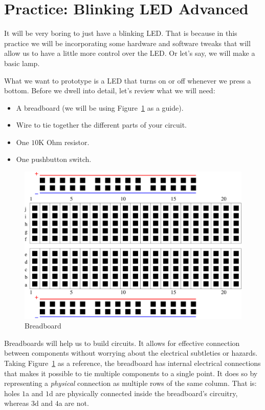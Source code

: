 \section{Practice: Blinking LED Advanced}\label{pract:blinkingLEDAdvanced}

It will be very boring to just have a blinking LED. That is because in this practice we will be incorporating some hardware and software tweaks that will allow us to have a little more control over the LED. Or let's say, we will make a basic lamp.

What we want to prototype is a LED that turns on or off whenever we press a bottom. Before we dwell into detail, let's review what we will need:

\begin{itemize}
	\item A breadboard (we will be using Figure~\ref{fig:breadboard} as a guide).
	\item Wire to tie together the different parts of your circuit.
	\item One $10$K Ohm resistor.
	\item One pushbutton switch.	
\end{itemize}

\begin{figure}[htbp]
  \centering
  \includegraphics[width=0.7\linewidth]{figures/breadboard.eps}
  \caption{Breadboard
  \label{fig:breadboard}}
\end{figure}

Breadboards will help us to build circuits. It allows for effective connection between components without worrying about the electrical subtleties or hazards. Taking Figure~\ref{fig:breadboard} as a reference, the breadboard has internal electrical connections that makes it possible to tie multiple components to a single point. It does so by representing a \emph{physical} connection as multiple rows of the same column. That is: holes $1$a and $1$d are physically connected inside the breadboard's circuitry, whereas $3$d and $4$a are not.

